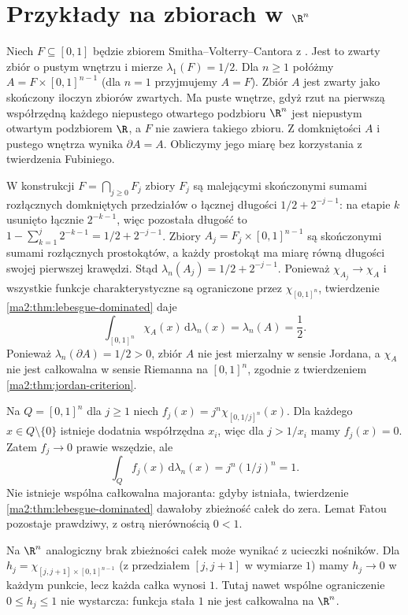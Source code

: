 \section{Przykłady na zbiorach w \texorpdfstring{$\R^n$}{R\textasciicircum n}}

\begin{przyklad}
\label{ma2:ex:lebesgue-fat-cantor-product}
Niech $F\subseteq[0,1]$ będzie zbiorem
Smitha--Volterry--Cantora z
.
Jest to zwarty zbiór o pustym wnętrzu
i mierze $\lambda_1(F)=1/2$.
Dla $n\ge1$ połóżmy $A=F\times[0,1]^{n-1}$
(dla $n=1$ przyjmujemy $A=F$).
Zbiór $A$ jest zwarty jako skończony
iloczyn zbiorów zwartych. Ma puste wnętrze,
gdyż rzut na pierwszą współrzędną każdego
niepustego otwartego podzbioru $\R^n$ jest
niepustym otwartym podzbiorem $\R$, a $F$
nie zawiera takiego zbioru. Z domkniętości
$A$ i pustego wnętrza wynika $\partial A=A$. Obliczymy jego miarę
bez korzystania z twierdzenia Fubiniego.

W konstrukcji $F=\bigcap_{j\ge0}F_j$ zbiory
$F_j$ są malejącymi skończonymi sumami
rozłącznych domkniętych przedziałów
o łącznej długości $1/2+2^{-j-1}$:
na etapie $k$ usunięto łącznie $2^{-k-1}$,
więc pozostała długość to
$1-\sum_{k=1}^j2^{-k-1}=1/2+2^{-j-1}$.
Zbiory $A_j=F_j\times[0,1]^{n-1}$
są skończonymi sumami rozłącznych
prostokątów, a każdy prostokąt ma miarę
równą długości swojej pierwszej krawędzi.
Stąd $\lambda_n(A_j)=1/2+2^{-j-1}$.
Ponieważ $\chi_{A_j}\to\chi_A$ i wszystkie
funkcje charakterystyczne są ograniczone
przez $\chi_{[0,1]^n}$, twierdzenie
\ref{ma2:thm:lebesgue-dominated} daje
\[
 \int_{[0,1]^n}\chi_A(x)\,\mathrm d\lambda_n(x)
 =\lambda_n(A)=\frac12.
\]
Ponieważ $\lambda_n(\partial A)=1/2>0$,
zbiór $A$ nie jest mierzalny w sensie
Jordana, a $\chi_A$ nie jest całkowalna
w sensie Riemanna na $[0,1]^n$, zgodnie
z twierdzeniem \ref{ma2:thm:jordan-criterion}.
\end{przyklad}

\begin{przyklad}
\label{ma2:ex:lebesgue-concentration}
Na $Q=[0,1]^n$ dla $j\ge1$ niech
$f_j(x)=j^n\chi_{[0,1/j]^n}(x)$.
Dla każdego $x\in Q\setminus\{0\}$
istnieje dodatnia współrzędna $x_i$,
więc dla $j>1/x_i$ mamy $f_j(x)=0$.
Zatem $f_j\to0$ prawie wszędzie, ale
\[
 \int_Q f_j(x)\,\mathrm d\lambda_n(x)
 =j^n(1/j)^n=1.
\]
Nie istnieje wspólna całkowalna majoranta:
gdyby istniała, twierdzenie
\ref{ma2:thm:lebesgue-dominated}
dawałoby zbieżność całek do zera.
Lemat Fatou pozostaje prawdziwy,
z ostrą nierównością $0<1$.

Na $\R^n$ analogiczny brak zbieżności
całek może wynikać z ucieczki nośników.
Dla $h_j=\chi_{[j,j+1]\times[0,1]^{n-1}}$
(z przedziałem $[j,j+1]$ w wymiarze $1$)
mamy $h_j\to0$ w każdym punkcie, lecz
każda całka wynosi $1$. Tutaj nawet
wspólne ograniczenie $0\le h_j\le1$
nie wystarcza: funkcja stała $1$
nie jest całkowalna na $\R^n$.
\end{przyklad}

